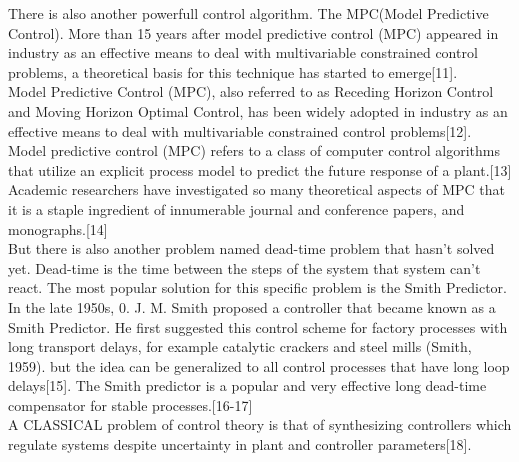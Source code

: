 \documentclass[9pt]{article}
\begin{document}
\begin{multicols}{2}
There is also another powerfull control algorithm. The MPC(Model Predictive Control). More than 15 years after model predictive control (MPC) appeared in industry as an effective means to deal with multivariable constrained control problems, a theoretical basis for this technique has started to emerge[11].\\[0.4mm]
Model Predictive Control (MPC), also referred to as Receding Horizon Control and Moving Horizon Optimal Control, has been widely adopted in industry as an effective means to deal with multivariable constrained control problems[12].\\[0.4mm]
Model predictive control (MPC) refers to a class of
computer control algorithms that utilize an explicit
process model to predict the future response of a plant.[13]
Academic researchers have investigated so many theoretical aspects of MPC that
it is a staple ingredient of innumerable journal and conference papers, and monographs.[14]\\[0.4mm]
But there is also another problem named dead-time problem that hasn't solved yet.
Dead-time is the time between the steps of the system that system can't react. The most popular solution for this specific problem is the Smith Predictor.\\[0.4mm]
In the late 1950s, 0. J. M. Smith proposed a controller
that became known as a Smith Predictor. He first suggested
this control scheme for factory processes with long transport delays, for example catalytic crackers and steel mills
(Smith, 1959). but the idea can be generalized to all control
processes that have long loop delays[15]. The Smith predictor is a popular and very effective long dead-time compensator for stable processes.[16-17]\\[0.4mm]
A CLASSICAL problem of control theory is that of
synthesizing controllers which regulate systems
despite uncertainty in plant and controller
parameters[18].


\end{multicols}
\end{document}
